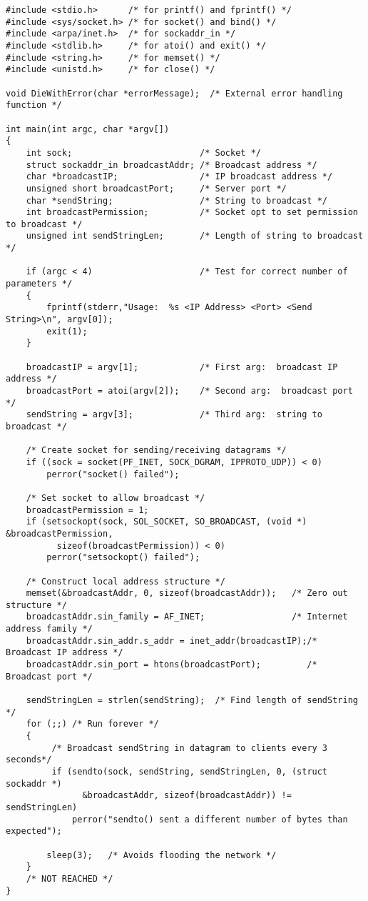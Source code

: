 \documentclass[12pt]{article}
\begin{document}
\begin{lstlisting}
#include <stdio.h>      /* for printf() and fprintf() */
#include <sys/socket.h> /* for socket() and bind() */
#include <arpa/inet.h>  /* for sockaddr_in */
#include <stdlib.h>     /* for atoi() and exit() */
#include <string.h>     /* for memset() */
#include <unistd.h>     /* for close() */

void DieWithError(char *errorMessage);  /* External error handling function */

int main(int argc, char *argv[])
{
    int sock;                         /* Socket */
    struct sockaddr_in broadcastAddr; /* Broadcast address */
    char *broadcastIP;                /* IP broadcast address */
    unsigned short broadcastPort;     /* Server port */
    char *sendString;                 /* String to broadcast */
    int broadcastPermission;          /* Socket opt to set permission to broadcast */
    unsigned int sendStringLen;       /* Length of string to broadcast */

    if (argc < 4)                     /* Test for correct number of parameters */
    {
        fprintf(stderr,"Usage:  %s <IP Address> <Port> <Send String>\n", argv[0]);
        exit(1);
    }

    broadcastIP = argv[1];            /* First arg:  broadcast IP address */ 
    broadcastPort = atoi(argv[2]);    /* Second arg:  broadcast port */
    sendString = argv[3];             /* Third arg:  string to broadcast */

    /* Create socket for sending/receiving datagrams */
    if ((sock = socket(PF_INET, SOCK_DGRAM, IPPROTO_UDP)) < 0)
        perror("socket() failed");

    /* Set socket to allow broadcast */
    broadcastPermission = 1;
    if (setsockopt(sock, SOL_SOCKET, SO_BROADCAST, (void *) &broadcastPermission, 
          sizeof(broadcastPermission)) < 0)
        perror("setsockopt() failed");

    /* Construct local address structure */
    memset(&broadcastAddr, 0, sizeof(broadcastAddr));   /* Zero out structure */
    broadcastAddr.sin_family = AF_INET;                 /* Internet address family */
    broadcastAddr.sin_addr.s_addr = inet_addr(broadcastIP);/* Broadcast IP address */
    broadcastAddr.sin_port = htons(broadcastPort);         /* Broadcast port */

    sendStringLen = strlen(sendString);  /* Find length of sendString */
    for (;;) /* Run forever */
    {
         /* Broadcast sendString in datagram to clients every 3 seconds*/
         if (sendto(sock, sendString, sendStringLen, 0, (struct sockaddr *) 
               &broadcastAddr, sizeof(broadcastAddr)) != sendStringLen)
             perror("sendto() sent a different number of bytes than expected");

        sleep(3);   /* Avoids flooding the network */
    }
    /* NOT REACHED */
}
\end{lstlisting}
\end{document}
